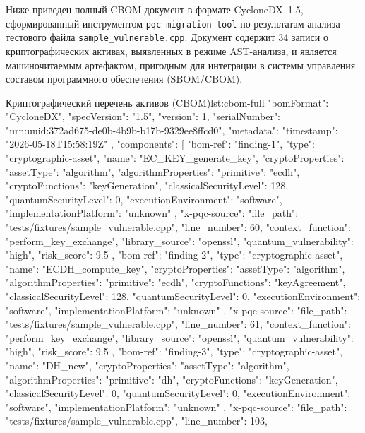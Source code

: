 \documentclass{itmo-vkr}
\begin{document}
Ниже приведен полный CBOM\nobreakdash-документ в формате CycloneDX~1.5, сформированный инструментом \texttt{pqc-migration-tool} по результатам анализа тестового файла \texttt{sample\_vulnerable.cpp}. Документ содержит 34 записи о криптографических активах, выявленных в режиме AST-анализа, и является машиночитаемым артефактом, пригодным для интеграции в системы управления составом программного обеспечения (SBOM/CBOM).

\begin{itmolisting}[JSON]{Криптографический перечень активов (CBOM)}{lst:cbom-full}
	{
		"bomFormat": "CycloneDX",
		"specVersion": "1.5",
		"version": 1,
		"serialNumber": "urn:uuid:372ad675-de0b-4b9b-b17b-9329ee8ffcd0",
		"metadata": {
			"timestamp": "2026-05-18T15:58:19Z"
		},
		"components": [
		{
			"bom-ref": "finding-1",
			"type": "cryptographic-asset",
			"name": "EC_KEY_generate_key",
			"cryptoProperties": {
				"assetType": "algorithm",
				"algorithmProperties": {
					"primitive": "ecdh",
					"cryptoFunctions": "keyGeneration",
					"classicalSecurityLevel": 128,
					"quantumSecurityLevel": 0,
					"executionEnvironment": "software",
					"implementationPlatform": "unknown"
				}
			},
			"x-pqc-source": {
				"file_path": "tests/fixtures/sample_vulnerable.cpp",
				"line_number": 60,
				"context_function": "perform_key_exchange",
				"library_source": "openssl",
				"quantum_vulnerability": "high",
				"risk_score": 9.5
			}
		},
		{
			"bom-ref": "finding-2",
			"type": "cryptographic-asset",
			"name": "ECDH_compute_key",
			"cryptoProperties": {
				"assetType": "algorithm",
				"algorithmProperties": {
					"primitive": "ecdh",
					"cryptoFunctions": "keyAgreement",
					"classicalSecurityLevel": 128,
					"quantumSecurityLevel": 0,
					"executionEnvironment": "software",
					"implementationPlatform": "unknown"
				}
			},
			"x-pqc-source": {
				"file_path": "tests/fixtures/sample_vulnerable.cpp",
				"line_number": 61,
				"context_function": "perform_key_exchange",
				"library_source": "openssl",
				"quantum_vulnerability": "high",
				"risk_score": 9.5
			}
		},
		{
			"bom-ref": "finding-3",
			"type": "cryptographic-asset",
			"name": "DH_new",
			"cryptoProperties": {
				"assetType": "algorithm",
				"algorithmProperties": {
					"primitive": "dh",
					"cryptoFunctions": "keyGeneration",
					"classicalSecurityLevel": 0,
					"quantumSecurityLevel": 0,
					"executionEnvironment": "software",
					"implementationPlatform": "unknown"
				}
			},
			"x-pqc-source": {
				"file_path": "tests/fixtures/sample_vulnerable.cpp",
				"line_number": 103,
}}}
\end{itmolisting}
\end{document}
